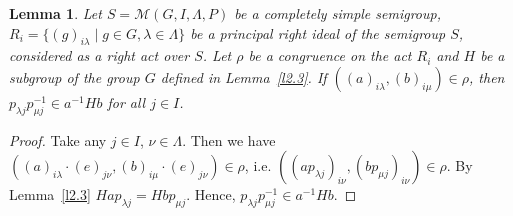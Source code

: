 \documentclass{birkau}
\numberwithin{equation}{section}
\theoremstyle{plain}
\newtheorem{lemma}[theorem]{Lemma}
\theoremstyle{definition}
\begin{document}
	\begin{lemma} \label{l2.4}
	    Let $S = \mathcal{M}(G,I,\Lambda,P)$ be a completely simple semigroup, $R_i = \{ (g)_{i \lambda} \mid g \in G, \lambda \in \Lambda \} $ be a principal right ideal of the semigroup $S$, considered as a right act over $S$. Let $\rho$ be a congruence on the act $R_i$ and $H$ be a subgroup of the group $G$ defined in Lemma~\ref{l2.3}. If $((a)_{i \lambda},(b)_{i \mu}) \in \rho$, then $p_{\lambda j}p_{\mu j}^{-1} \in a^{-1} H b$ for all $j \in I$.
	\end{lemma}
	\begin{proof}
	    Take any $j \in I$, $\nu \in \Lambda$. Then we have $((a)_{i \lambda} \cdot (e)_{j \nu},(b)_{i \mu} \cdot (e)_{j \nu}) \in \rho$, i.e. $((ap_{\lambda j})_{i \nu},(bp_{\mu j})_{i \nu}) \in \rho$. By Lemma~\ref{l2.3} $H a p_{\lambda j} = H b p_{\mu j}$. Hence, $p_{\lambda j} p_{\mu j}^{-1} \in a^{-1} H b$.
	\end{proof}
	
\end{document}
